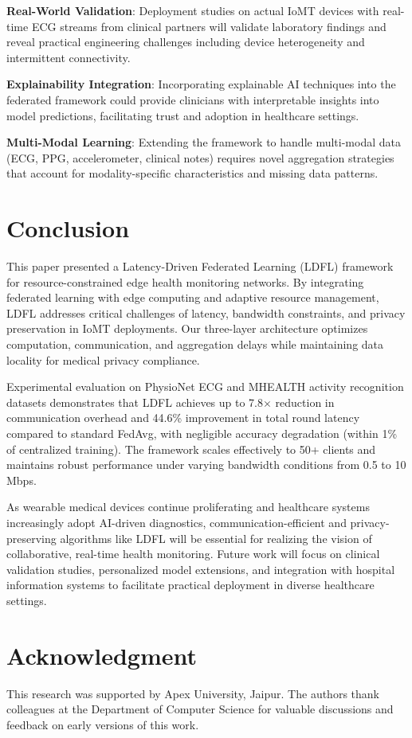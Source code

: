 \documentclass[10pt,conference]{IEEEtran}
\begin{document}
\textbf{Real-World Validation}: Deployment studies on actual IoMT devices with real-time ECG streams from clinical partners will validate laboratory findings and reveal practical engineering challenges including device heterogeneity and intermittent connectivity.

\textbf{Explainability Integration}: Incorporating explainable AI techniques into the federated framework could provide clinicians with interpretable insights into model predictions, facilitating trust and adoption in healthcare settings.

\textbf{Multi-Modal Learning}: Extending the framework to handle multi-modal data (ECG, PPG, accelerometer, clinical notes) requires novel aggregation strategies that account for modality-specific characteristics and missing data patterns.

\section{Conclusion}
\label{sec:conclusion}

This paper presented a Latency-Driven Federated Learning (LDFL) framework for resource-constrained edge health monitoring networks. By integrating federated learning with edge computing and adaptive resource management, LDFL addresses critical challenges of latency, bandwidth constraints, and privacy preservation in IoMT deployments. Our three-layer architecture optimizes computation, communication, and aggregation delays while maintaining data locality for medical privacy compliance.

Experimental evaluation on PhysioNet ECG and MHEALTH activity recognition datasets demonstrates that LDFL achieves up to 7.8$\times$ reduction in communication overhead and 44.6\% improvement in total round latency compared to standard FedAvg, with negligible accuracy degradation (within 1\% of centralized training). The framework scales effectively to 50+ clients and maintains robust performance under varying bandwidth conditions from 0.5 to 10 Mbps.

As wearable medical devices continue proliferating and healthcare systems increasingly adopt AI-driven diagnostics, communication-efficient and privacy-preserving algorithms like LDFL will be essential for realizing the vision of collaborative, real-time health monitoring. Future work will focus on clinical validation studies, personalized model extensions, and integration with hospital information systems to facilitate practical deployment in diverse healthcare settings.

\section*{Acknowledgment}
This research was supported by Apex University, Jaipur. The authors thank colleagues at the Department of Computer Science for valuable discussions and feedback on early versions of this work.



\end{document}
